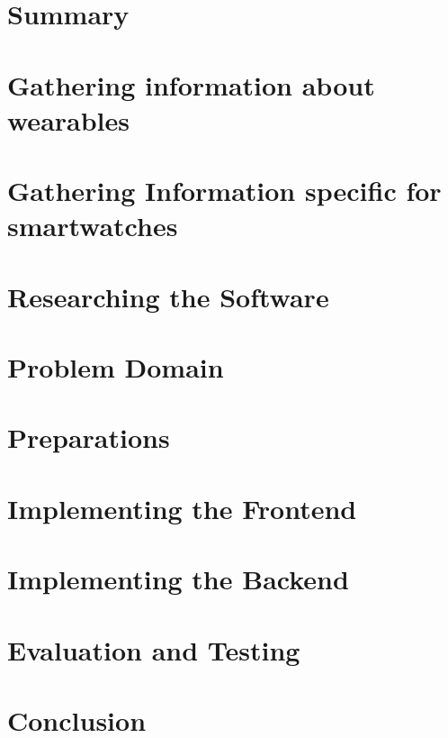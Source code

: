 \chapter{Summary}


\chapter{Gathering information about wearables}


\chapter{Gathering Information specific for smartwatches}


\chapter{Researching the Software}


\chapter{Problem Domain}


\chapter{Preparations}


\chapter{Implementing the Frontend}


\chapter{Implementing the Backend}


\chapter{Evaluation and Testing}


\chapter{Conclusion}
